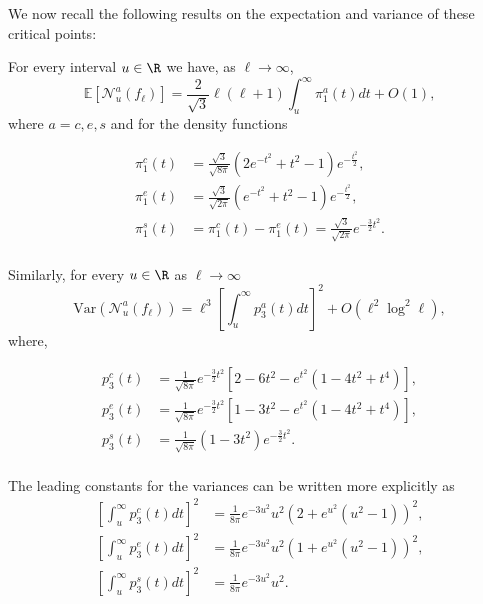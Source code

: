 \documentclass[aps,prd,showpacs,superscriptaddress,groupedaddress]{revtex4-1}  %
\begin{document}
We now recall the following results on the expectation and variance of these critical points:


For every interval $u \in \R$ we have, as $\ell \rightarrow \infty$,
\begin{equation*}
\mathbb{E}[\mathcal{N}_{u}^{a}(f_{\ell })] =\frac{2}{\sqrt{3}} \ell(\ell+1) \int_{u}^{\infty}\pi _{1}^{a}(t)dt+O(1),
\end{equation*}
where $a=c,e,s$ and for the density
functions

\begin{align}  
  \pi _{1}^{c}(t)&=\frac{\sqrt{3}}{\sqrt{8\pi
                   }}(2e^{-t^{2}}+t^{2}-1)e^{-\frac{                   
                   t^{2}}{2}}, \\
  \pi _{1}^{e}(t)&=\frac{\sqrt{3}}{\sqrt{2\pi
                   }}(e^{-t^{2}}+t^{2}-1)e^{-\frac{                   
                   t^{2}}{2}},\\
  \pi _{1}^{s}(t)&=\pi _{1}^{c}(t)-\pi
                   _{1}^{e}(t)=\frac{\sqrt{3}}{\sqrt{2\pi
                   }}e^{-\frac{3}{2}t^{2}}.\\
  \label{eqn:exp_crit}                                  
\end{align}



Similarly, for every $u \in \R$ as $\ell \rightarrow \infty $
\begin{equation*}
{\text{Var}}(\mathcal{N}_{u}^{a}(f_{\ell }))=\ell^3 \left[
\int_{u}^{\infty}p_{3}^{a}(t)dt\right] ^{2}+O(\ell^{2}\log^2 \ell),
\end{equation*}
where,

\begin{align*}
  p_{3}^{c}(t)&=\frac{1}{ \sqrt{8 \pi }}e^{-\frac{3}{2} t^{2}
                }[2-6t^{2}-e^{t^{2}}(1-4t^{2}+t^{4})], \\
  p_{3}^{e}(t)&=\frac{1}{ \sqrt{8 \pi }}e^{-\frac{3}{2} t^{2}
                }[1-3t^{2}-e^{t^{2}}(1-4t^{2}+t^{4})],\\
  p_{3}^{s}(t)&=\frac{1}{ \sqrt{8 \pi }}(1-3t^{2})e^{-\frac{3}{2}%
                t^{2}}. \\
  \label{eqn:var_crit}
\end{align*}

The leading constants for the variances can be written more explicitly as
\begin{align}
  \left[ \int_{u}^{\infty }p_3^c(t)dt \right]^{2}&=\frac{1}{8 \pi} e^{- 3 u^2} u^2 (2+ e^{u^2}
                                                   (u^2-1))^2, \\
  \left[ \int_{u}^{\infty }p_3^e(t)dt \right]^{2}&= \frac{1}{8 \pi}  e^{- 3
                                                   u^2} u^2 (1+ e^{u^2} (u^2-1))^2,\\
  \left[ \int_{u}^{\infty }p_3^s(t)dt \right]^{2}&=\frac{1}{8 \pi}  e^{- 3 u^2} u^2.
\end{align}
\end{document}

